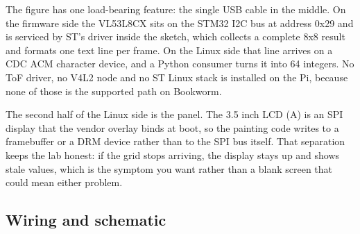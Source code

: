 
The figure has one load-bearing feature: the single USB cable in the middle. On the
firmware side the VL53L8CX sits on the STM32 I2C bus at address 0x29 and is serviced by
ST's driver inside the sketch, which collects a complete 8x8 result and formats one text
line per frame. On the Linux side that line arrives on a CDC ACM character device, and a
Python consumer turns it into 64 integers. No ToF driver, no V4L2 node and no ST Linux
stack is installed on the Pi, because none of those is the supported path on Bookworm.

The second half of the Linux side is the panel. The 3.5 inch LCD (A) is an SPI display
that the vendor overlay binds at boot, so the painting code writes to a framebuffer or a
DRM device rather than to the SPI bus itself. That separation keeps the lab honest: if
the grid stops arriving, the display stays up and shows stale values, which is the
symptom you want rather than a blank screen that could mean either problem.

\subsection*{Wiring and schematic}


